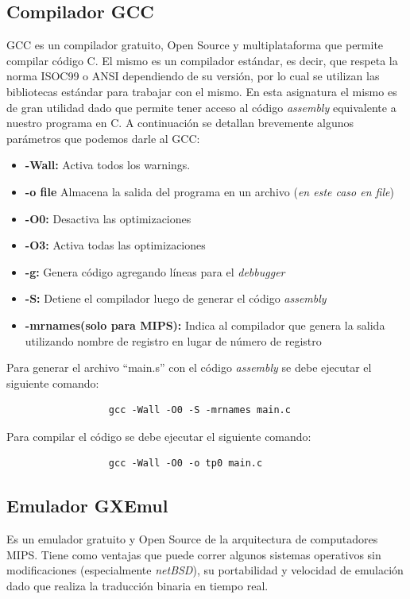 \documentclass[a4paper,10pt, fleqn]{article}
\begin{document}
	\subsection{Compilador GCC}
		GCC es un compilador gratuito, Open Source y multiplataforma que permite compilar código C. 
		El mismo es un compilador estándar, es decir, que respeta la norma ISOC99 o ANSI dependiendo de su versión, por lo cual se utilizan las 
		bibliotecas estándar para trabajar con el mismo. En esta asignatura el mismo es de gran utilidad dado que permite tener acceso  al código 
		\emph{assembly} equivalente a nuestro programa en C. A continuación se detallan brevemente algunos parámetros que podemos darle al GCC:
		\begin{itemize}
			\item \textbf{-Wall:} Activa todos los warnings.
			\item \textbf{-o file} Almacena la salida del programa en un archivo (\emph{en este caso en file})
			\item \textbf{-O0:} Desactiva las optimizaciones
			\item \textbf{-O3:} Activa todas las optimizaciones
			\item \textbf{-g:} Genera código agregando líneas para el \emph{debbugger}
			\item \textbf{-S:} Detiene el compilador luego de generar el código \emph{assembly}
			\item \textbf{-mrnames(solo para MIPS):} Indica al compilador que genera la salida utilizando 
									 nombre de registro en lugar de número de registro
		\end{itemize}
		Para generar el archivo ``main.s'' con el código \emph{assembly} se debe ejecutar el siguiente comando: 
		  \begin{verbatim}
			      gcc -Wall -O0 -S -mrnames main.c
		  \end{verbatim}
		Para compilar el código se debe ejecutar el siguiente comando:
		\begin{verbatim}
			      gcc -Wall -O0 -o tp0 main.c
		 \end{verbatim}
		\vspace{0.5cm}

	\subsection{Emulador GXEmul}
		Es un emulador gratuito y Open Source de la arquitectura de computadores MIPS. Tiene como ventajas que puede correr algunos sistemas operativos
		sin modificaciones (especialmente \emph{netBSD}), su portabilidad y velocidad de emulación dado que realiza la traducción binaria en 
		tiempo real. 
		\vspace{0.5cm}
	
\end{document}

